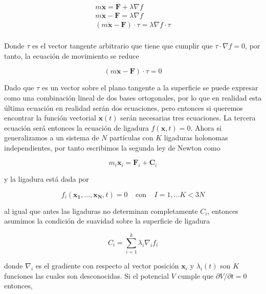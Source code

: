     \begin{gather*}
        m\ddot{\mathbf{x}} = \mathbf{F} + \lambda \nabla f\\
        m\ddot{\mathbf{x}} - \mathbf{F} =  \lambda \nabla f\\
        (m\ddot{\mathbf{x}} - \mathbf{F}) \cdot {\tau} =  \lambda \nabla f \cdot \tau \\
    \end{gather*}

    Donde $\tau$ es el vector tangente arbitrario que tiene que cumplir que $\tau \cdot \nabla f = 0$, por tanto, la ecuación de movimiento se reduce  

    \begin{equation*}
        (m\ddot{\mathbf{x}} - \mathbf{F}) \cdot {\tau} = 0
    \end{equation*}

    Dado que $\tau$ es un vector sobre el plano tangente a la superficie se puede expresar como una combinación lineal de dos bases ortogonales, por lo que en realidad esta última ecuación en realidad serán dos ecuaciones, pero entonces si queremos encontrar la función vectorial $\mathbf{x}(t)$ serán necesarias tres ecuaciones. La tercera ecuación será entonces la ecuación de ligadura $f(\mathbf{x},t) = 0$.    Ahora si generalizamos a un sistema de $N$ partículas con $K$ ligaduras holonomas independientes, por tanto escribimos la segunda ley de Newton como

    \begin{equation*}
        m_i \ddot{\mathbf{x}_i} = \mathbf{F}_i + \mathbf{C}_i
    \end{equation*}
    
    y la ligadura está dada por

    \begin{equation*}
        f_i (\mathbf{x_1}, \dots, \mathbf{x_N},t) = 0 \;\;\;\; \text{con} \;\;\;\; I = 1, \dots K < 3N
    \end{equation*}

    al igual que antes las ligaduras no determinan completamente $C_i$, entonces asumimos la condición de suavidad sobre la superficie de ligadura 

    \begin{equation*}
        C_i = \sum_{i = 1}^{k} \lambda_i \nabla_i f_i
    \end{equation*}

    donde $\nabla_i$ es el gradiente con respecto al vector posición $\mathbf{x}_i$ y $\lambda_i(t)$ son $K$ funciones las cuales son desconocidas. Si el potencial $V$ cumple que $\partial V/\partial t = 0$ entonces,

